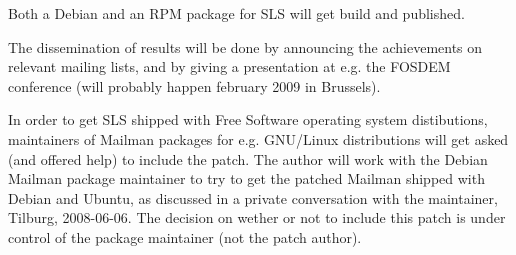\documentclass[a4]{article}
\begin{document}
Both a Debian and an RPM package for SLS will get build and published.

The dissemination of results will be done by announcing the achievements on
relevant mailing lists, and by giving a presentation at e.g. the FOSDEM
conference (will probably happen february 2009 in Brussels).

In order to get SLS shipped with Free Software operating system distibutions,
maintainers of Mailman packages for e.g. GNU/Linux distributions will get asked
(and offered help) to include the patch.  The author will work with the Debian
Mailman package maintainer to try to get the patched Mailman shipped with
Debian and Ubuntu, as discussed in a private conversation with the maintainer,
Tilburg, 2008-06-06.  The decision on wether or not to include this patch is
under control of the package maintainer (not the patch author).
\end{document}
